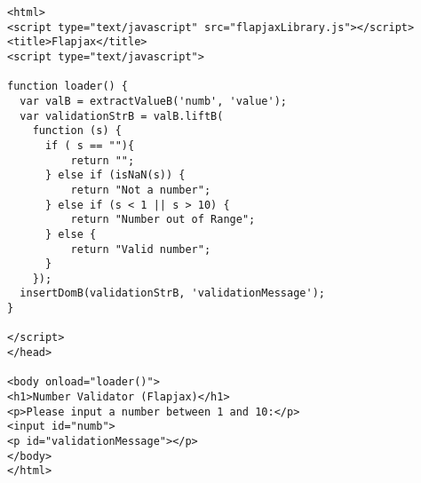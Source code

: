 \begin{verbatim}
<html>
<script type="text/javascript" src="flapjaxLibrary.js"></script>
<title>Flapjax</title>
<script type="text/javascript">

function loader() {
  var valB = extractValueB('numb', 'value');
  var validationStrB = valB.liftB(
    function (s) {
      if ( s == ""){
          return "";
      } else if (isNaN(s)) {
          return "Not a number";
      } else if (s < 1 || s > 10) {
          return "Number out of Range";
      } else {
          return "Valid number";
      }
    });
  insertDomB(validationStrB, 'validationMessage');
}

</script>
</head>

<body onload="loader()">
<h1>Number Validator (Flapjax)</h1>
<p>Please input a number between 1 and 10:</p>
<input id="numb">
<p id="validationMessage"></p>
</body>
</html>
\end{verbatim}
